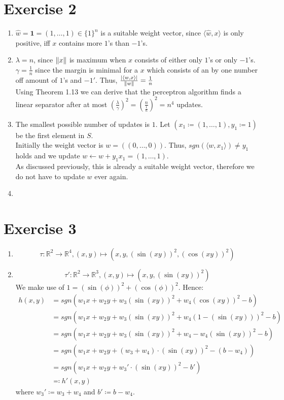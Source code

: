 \documentclass[12pt]{article}
\DeclarePairedDelimiter\abs{\lvert}{\rvert}
\DeclarePairedDelimiter\Abs{\lVert}{\rVert}
\begin{document}
\section*{Exercise 2}
\begin{enumerate}[label=(\alph*)]
	\item	$\hat{w}=\textbf{1}=(1, \dots, 1) \in \{1\}^n$ is a suitable weight vector, since $\langle \hat{w},x \rangle$ is only positive, iff $x$ contains more $1$'s than $-1$'s.
	\item	$\lambda = n$, since $\Abs{x}$ is maximum when $x$ consists of either only $1$'s or only $-1$'s. \\
			$\gamma = \frac{1}{n}$ since the margin is minimal for a $x$ which consists of an by one number off amount of $1$'s and $-1'$. Thus, $\frac{\abs{\langle w,x \rangle}}{\Abs{w}} = \frac{1}{n}$ \\
			Using Theorem 1.13 we can derive that the perceptron algorithm finds a linear separator after at most $\left(\frac{\lambda}{\gamma}\right)^2 = \left( \frac{n}{\frac{1}{n}}\right)^2 = n^4$ updates.
	\item	The smallest possible number of updates is $1$. Let $(x_1 \coloneqq (1, \dots, 1), y_1 \coloneqq 1)$ be the first element in $S$. \\
			Initially the weight vector is $w=((0, \dots, 0))$. Thus, $sgn(\langle w, x_1 \rangle) \neq y_1$ holds and we update $w \leftarrow w + y_1 x_1 = (1, \dots, 1)$. \\
			As discussed previously, this is already a suitable weight vector, therefore we do not have to update $w$ ever again.
	\item
\end{enumerate}

\section*{Exercise 3}
\begin{enumerate}[label=(\alph*)]
	\item	\[\tau : \mathbb{R}^2 \rightarrow \mathbb{R}^4, (x,y) \mapsto (x,y,(\sin(xy))^2, (\cos(xy))^2)\]
	\item	\[\tau' : \mathbb{R}^2 \rightarrow \mathbb{R}^3, (x,y) \mapsto (x,y, (\sin(xy))^2)\]
			We make use of $1 = (\sin(\phi))^2 + (\cos(\phi))^2$. Hence:
			\begin{align*}
				h(x,y) &= sgn(w_1 x + w_2 y + w_3 (\sin(xy))^2 + w_4 (\cos(xy))^2 - b) \\
				&= sgn(w_1 x + w_2 y + w_3 (\sin(xy))^2 + w_4 (1-(\sin(xy)))^2 - b) \\
				&= sgn(w_1 x + w_2 y + w_3 (\sin(xy))^2 + w_4 - w_4 (\sin(xy))^2 - b) \\
				&= sgn(w_1 x + w_2 y + (w_3 + w_4) \cdot (\sin(xy))^2 - (b - w_4)) \\
				&= sgn(w_1 x + w_2 y + w_3' \cdot (\sin(xy))^2 - b') \\
				&\eqqcolon h'(x,y)
			\end{align*}
			where $w_3' \coloneqq w_3 + w_4$ and $b' \coloneqq b - w_4$.
\end{enumerate}
\end{document}
